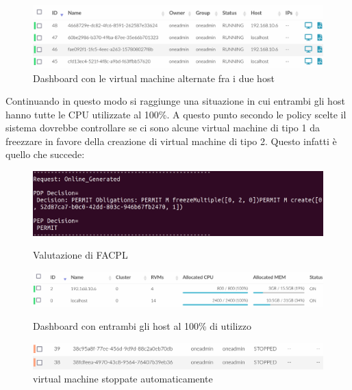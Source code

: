 \begin{figure}[H]
    \centering
    \includegraphics[width=\textwidth]{tesi_screenshot/alternating.png}
    \caption{Dashboard con le virtual machine alternate fra i due host}
\end{figure}
Continuando in questo modo si raggiunge una situazione in cui entrambi gli host hanno tutte le CPU utilizzate al 100\%. A questo punto secondo le policy scelte il sistema dovrebbe controllare se ci sono alcune virtual machine di tipo 1 da freezzare in favore della creazione di virtual machine di tipo 2. Questo infatti è quello che succede:
\begin{figure}[H]
    \centering
    \begin{minipage}{\textwidth}
        \centering
        \includegraphics[width=\textwidth]{tesi_screenshot/permitReleaseCreateLonger.png}
        \caption{Valutazione di FACPL}
        \label{fig:full_hosts}
    \end{minipage}
    \begin{minipage}{\textwidth}
        \centering
        \includegraphics[width=\textwidth]{tesi_screenshot/full_hosts.png}
        \caption{Dashboard con entrambi gli host al 100\% di utilizzo}
        \label{fig:full_hosts}
    \end{minipage}
    \par \medskip
    \begin{minipage}{\textwidth}
        \centering
        \includegraphics[width=\textwidth]{tesi_screenshot/stoppedVMS.png}
        \caption{virtual machine stoppate automaticamente}
    \end{minipage}
\end{figure}
